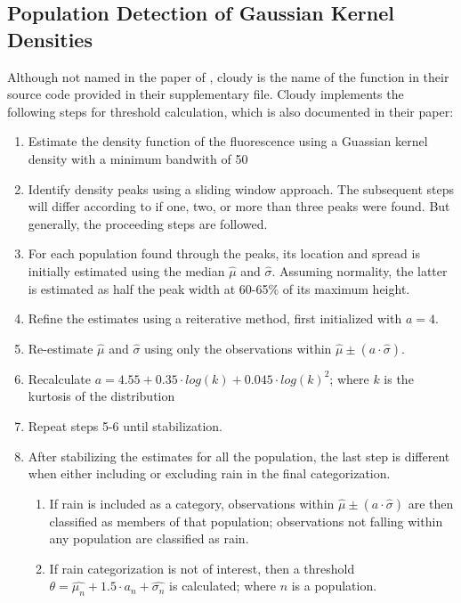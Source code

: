 \subsection{Population Detection of Gaussian Kernel Densities}
\label{sec:peakdetectionkde}
Although not named in the paper of , cloudy is the name of the function in their source code provided in their supplementary file. Cloudy implements the following steps for threshold calculation, which is also documented in their paper:
\begin{enumerate}
    \item Estimate the density function of the fluorescence using a Guassian kernel density with a minimum bandwith of 50
    \item Identify density peaks using a sliding window approach. The subsequent steps will differ according to if one, two, or more than three peaks were found.  But generally, the proceeding steps are followed.
    \item For each population found through the peaks, its location and spread is initially estimated using the median \(\hat{\mu}\) and \(\hat{\sigma}\). Assuming normality, the latter is estimated as half the peak width at 60-65\% of its maximum height.
    \item Refine the estimates using a reiterative method, first initialized with \(a=4\).
    \item Re-estimate \(\hat{\mu}\) and \(\hat{\sigma}\) using only the observations within \(\hat{\mu} \pm (a \cdot \hat{\sigma})\).
    \item Recalculate \(a=4.55 + 0.35 \cdot log(k) + 0.045 \cdot log(k)^2\); where \(k\) is the kurtosis of the distribution
    \item Repeat steps 5-6 until stabilization.
    \item After stabilizing the estimates for all the population, the last step is different when either including or excluding rain in the final categorization. 
    \begin{enumerate}
        \item If rain is included as a category, observations within \(\hat{\mu} \pm (a \cdot \hat{\sigma})\) are then classified as members of that population; observations not falling within any population are classified as rain.
        \item If rain categorization is not of interest, then a threshold \(\theta=\hat{\mu_n} + 1.5 \cdot a_n + \hat{\sigma_n}\) is calculated; where \(n\) is a population.  
    \end{enumerate}

\end{enumerate}

